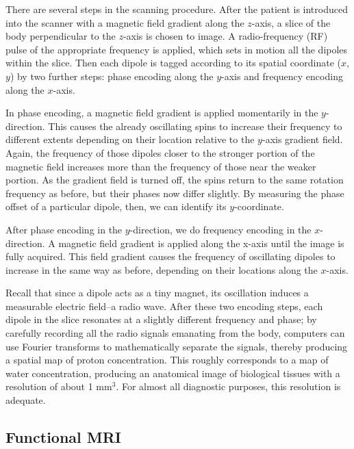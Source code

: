 There are several steps in the scanning procedure.  After the patient is introduced into the scanner with a magnetic field gradient along the $z$-axis, a slice of the body perpendicular to the $z$-axis is chosen to image.  A radio-frequency (RF) pulse of the appropriate frequency is applied, which sets in motion all the dipoles within the slice.  Then each dipole is tagged according to its spatial coordinate ($x$, $y$) by two further steps: phase encoding along the $y$-axis and frequency encoding along the $x$-axis.

In phase encoding, a magnetic field gradient is applied momentarily in the $y$-direction.  This causes the already oscillating spins to increase their frequency to different extents depending on their location relative to the $y$-axis gradient field.  Again, the frequency of those dipoles closer to the stronger portion of the magnetic field increases more than the frequency of those near the weaker portion.  As the gradient field is turned off, the spins return to the same rotation frequency as before, but their phases now differ slightly.  By measuring the phase offset of a particular dipole, then, we can identify its $y$-coordinate.

After phase encoding in the $y$-direction, we do frequency encoding in the $x$-direction.  A magnetic field gradient is applied along the x-axis until the image is fully acquired.  This field gradient causes the frequency of oscillating dipoles to increase in the same way as before, depending on their locations along the $x$-axis.

Recall that since a dipole acts as a tiny magnet, its oscillation induces a measurable electric field--a radio wave.  After these two encoding steps, each dipole in the slice resonates at a slightly different frequency and phase; by carefully recording all the radio signals emanating from the body, computers can use Fourier transforms to mathematically separate the signals, thereby producing a spatial map of proton concentration.  This roughly corresponds to a map of water concentration, producing an anatomical image of biological tissues with a resolution of about 1 mm$^3$.  For almost all diagnostic purposes, this resolution is adequate.  

\subsection{Functional MRI}

